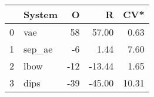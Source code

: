 \begin{tabular}{llrrr}
\toprule
 & System & O & R & CV* \\
\midrule
0 & vae & 58 & 57.00 & 0.63 \\
1 & sep\_ae & -6 & 1.44 & 7.60 \\
2 & lbow & -12 & -13.44 & 1.65 \\
3 & dips & -39 & -45.00 & 10.31 \\
\bottomrule
\end{tabular}

